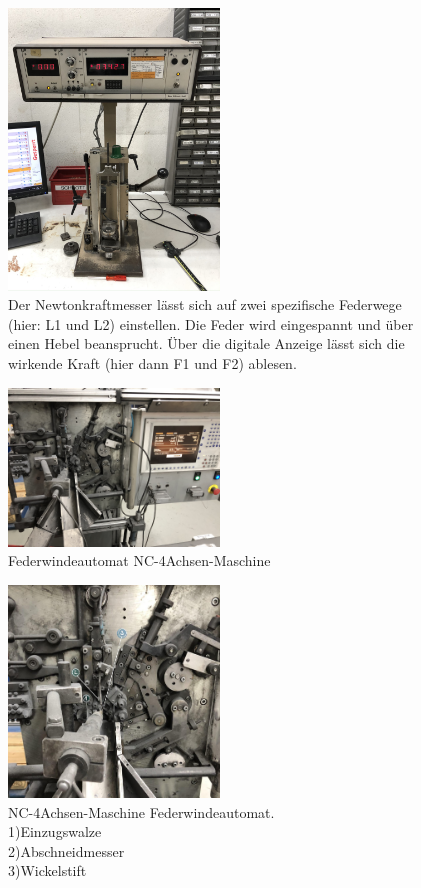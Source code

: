 \begin{figure}[H]
    \centering
    \includegraphics[width=0.5\textwidth]{bilder/fotos/kraftmesser.JPEG}
    \caption{Der Newtonkraftmesser lässt sich auf zwei spezifische Federwege (hier: L1 und L2)
    einstellen. Die Feder wird eingespannt und über einen Hebel beansprucht. Über die digitale Anzeige
    lässt sich die wirkende Kraft (hier dann F1 und F2) ablesen.}
    \label{fig:kraftmesser}
\end{figure}
\begin{figure}[H]
        \centering
        \includegraphics[width=0.5\textwidth]{bilder/fotos/maschine_gesamt.JPEG}
        \caption{Federwindeautomat NC-4Achsen-Maschine}
\end{figure}
\begin{figure}[H]
        \centering
        \includegraphics[width=0.5\textwidth]{bilder/fotos/maschine_nah_beschriftet.jpg}
        \caption{NC-4Achsen-Maschine Federwindeautomat.\\
        1)Einzugswalze\\
        2)Abschneidmesser\\
        3)Wickelstift}
\end{figure}

